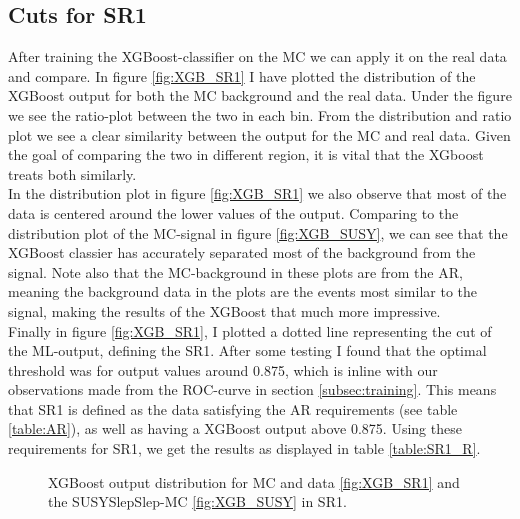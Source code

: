 \documentclass{article}
\begin{document}
\subsection{Cuts for SR1}
After training the XGBoost-classifier on the MC we can apply it on the real data and compare. In figure \ref{fig:XGB_SR1} I have plotted the distribution of the XGBoost output for both the MC background and the real data. Under the figure we see the ratio-plot between the two in each bin. From the distribution and ratio plot we see a clear similarity between the output for the MC and real data. Given the goal of comparing the two in different region, it is vital that the XGboost treats both similarly.
\\
In the distribution plot in figure \ref{fig:XGB_SR1} we also observe that most of the data is centered around the lower values of the output. Comparing to the distribution plot of the MC-signal in figure \ref{fig:XGB_SUSY}, we can see that the XGBoost classier has accurately separated most of the background from the signal. Note also that the MC-background in these plots are from the AR, meaning the background data in the plots are the events most similar to the signal, making the results of the XGBoost that much more impressive. \\
Finally in figure \ref{fig:XGB_SR1}, I plotted a dotted line representing the cut of the ML-output, defining the SR1. After some testing I found that the optimal threshold was for output values around 0.875, which is inline with our observations made from the ROC-curve in section \ref{subsec:training}. This means that SR1 is defined as the data satisfying the AR requirements (see table \ref{table:AR}), as well as having a XGBoost output above 0.875. Using these requirements for SR1, we get the results as displayed in table \ref{table:SR1_R}.
\\
\begin{figure}
    \caption{XGBoost output distribution for MC and data \ref{fig:XGB_SR1} and the SUSYSlepSlep-MC \ref{fig:XGB_SUSY} in SR1.}
\end{figure}
\end{document}

